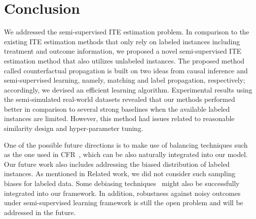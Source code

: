 \section{Conclusion}
We addressed the semi-supervised ITE estimation problem.
In comparison to the existing ITE estimation methods that only rely on labeled instances including treatment and outcome information, we proposed a novel semi-supervised ITE estimation method that also utilizes unlabeled instances.
The proposed method called counterfactual propagation is built on two ideas from causal inference and semi-supervised learning, namely, matching and label propagation, respectively; accordingly, we devised an efficient learning algorithm.
Experimental results using the semi-simulated real-world datasets revealed that our methods performed better in comparison to several strong baselines when the available labeled instances are limited. 
However, this method had issues related to reasonable similarity design and hyper-parameter tuning.



One of the possible future directions is to make use of balancing techniques such as the one used in CFR~\cite{shalit2017estimating}, which can be also naturally integrated into our model.
Our future work also includes addressing the biased distribution of labeled instances. 
As mentioned in Related work, we did not consider such sampling biases for labeled data. 
Some debiasing techniques~\cite{zhou2019graph} might also be successfully integrated into our framework. 
In addition, robustness against noisy outcomes under semi-supervised learning framework is still the open problem and will be addressed in the future.



